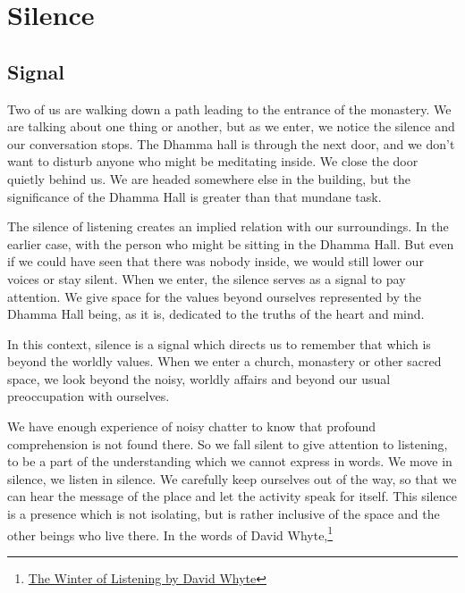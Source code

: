 \chapter{Silence}

\section{Signal}


\noindent Two of us are walking down a path leading to the entrance of
the monastery. We are talking about one thing or another, but as we
enter, we notice the silence and our conversation stops. The Dhamma hall
is through the next door, and we don't want to disturb anyone who might
be meditating inside. We close the door quietly behind us. We are headed
somewhere else in the building, but the significance of the Dhamma Hall
is greater than that mundane task.

The silence of listening creates an implied relation with our
surroundings. In the earlier case, with the person who might be sitting
in the Dhamma Hall. But even if we could have seen that there was nobody
inside, we would still lower our voices or stay silent. When we enter,
the silence serves as a signal to pay attention. We give space for the
values beyond ourselves represented by the Dhamma Hall being, as it is,
dedicated to the truths of the heart and mind.

\enlargethispage*{\baselineskip}

In this context, silence is a signal which directs us to remember that
which is beyond the worldly values. When we enter a church, monastery or
other sacred space, we look beyond the noisy, worldly affairs and beyond
our usual preoccupation with ourselves.

We have enough experience of noisy chatter to know that profound
comprehension is not found there. So we fall silent to give attention to
listening, to be a part of the understanding which we cannot express in
words. We move in silence, we listen in silence. We carefully keep
ourselves out of the way, so that we can hear the message of the place
and let the activity speak for itself. This silence is a presence which
is not isolating, but is rather inclusive of the space and the other
beings who live there. In the words of David Whyte,\footnote{\href{https://www.goodreads.com/quotes/10119971-the-winter-of-listening-no-one-but-me-by-the}{The
  Winter of Listening by David Whyte}}


